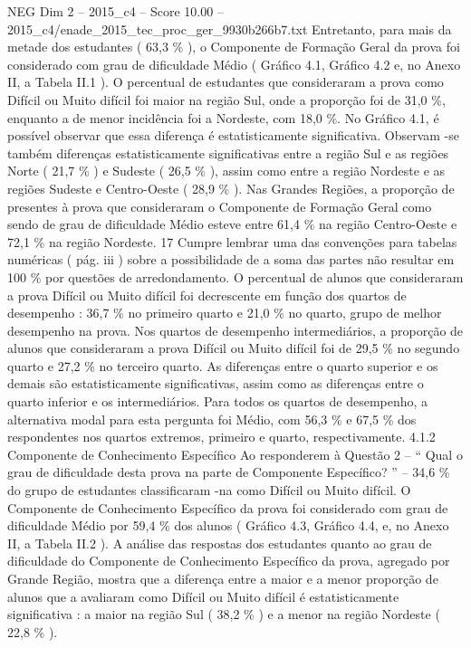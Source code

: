 \begin{textsample}{NEG Dim 2 – 2015\_c4 – Score 10.00 – 2015\_c4/enade\_2015\_tec\_proc\_ger\_9930b266b7.txt}
Entretanto, para mais da metade dos estudantes ( 63,3 \% ), o Componente de Formação Geral da prova foi considerado com grau de dificuldade Médio ( Gráfico 4.1, Gráfico 4.2 e, no Anexo II, a Tabela II.1 ).
O percentual de estudantes que consideraram a prova como Difícil ou Muito difícil foi maior na região Sul, onde a proporção foi de 31,0 \%, enquanto a de menor incidência foi a Nordeste, com 18,0 \%.
No Gráfico 4.1, é possível observar que essa diferença é estatisticamente significativa.
Observam -se também diferenças estatisticamente significativas entre a região Sul e as regiões Norte ( 21,7 \% ) e Sudeste ( 26,5 \% ), assim como entre a região Nordeste e as regiões Sudeste e Centro-Oeste ( 28,9 \% ).
Nas Grandes Regiões, a proporção de presentes à prova que consideraram o Componente de Formação Geral como sendo de grau de dificuldade Médio esteve entre 61,4 \% na região Centro-Oeste e 72,1 \% na região Nordeste. 17 Cumpre lembrar uma das convenções para tabelas numéricas ( pág. iii ) sobre a possibilidade de a soma das partes não resultar em 100 \% por questões de arredondamento.
O percentual de alunos que consideraram a prova Difícil ou Muito difícil foi decrescente em função dos quartos de desempenho : 36,7 \% no primeiro quarto e 21,0 \% no quarto, grupo de melhor desempenho na prova.
Nos quartos de desempenho intermediários, a proporção de alunos que consideraram a prova Difícil ou Muito difícil foi de 29,5 \% no segundo quarto e 27,2 \% no terceiro quarto.
As diferenças entre o quarto superior e os demais são estatisticamente significativas, assim como as diferenças entre o quarto inferior e os intermediários.
Para todos os quartos de desempenho, a alternativa modal para esta pergunta foi Médio, com 56,3 \% e 67,5 \% dos respondentes nos quartos extremos, primeiro e quarto, respectivamente. 4.1.2 Componente de Conhecimento Específico Ao responderem à Questão 2 – “ Qual o grau de dificuldade desta prova na parte de Componente Específico? ” – 34,6 \% do grupo de estudantes classificaram -na como Difícil ou Muito difícil.
O Componente de Conhecimento Específico da prova foi considerado com grau de dificuldade Médio por 59,4 \% dos alunos ( Gráfico 4.3, Gráfico 4.4, e, no Anexo II, a Tabela II.2 ).
A análise das respostas dos estudantes quanto ao grau de dificuldade do Componente de Conhecimento Específico da prova, agregado por Grande Região, mostra que a diferença entre a maior e a menor proporção de alunos que a avaliaram como Difícil ou Muito difícil é estatisticamente significativa : a maior na região Sul ( 38,2 \% ) e a menor na região Nordeste ( 22,8 \% ).

\end{textsample}
